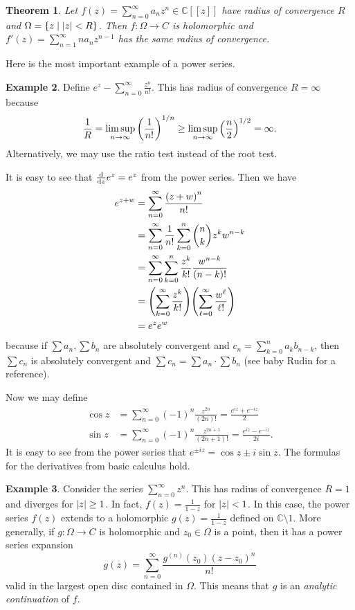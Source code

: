 \documentclass[leqno, openany]{memoir}
\newtheorem{thm}{Theorem}[section]
\theoremstyle{definition}
\newtheorem{exm}[thm]{Example}
\theoremstyle{remark}
\theoremstyle{plain}
\theoremstyle{definition}
\theoremstyle{remark}
\newcommand{\C}{\mathbb{C}}
\begin{document}
\begin{thm} Let $f(z) = \sum_{n=0}^{\infty} a_n z^n \in \C[[z]]$ have radius of
    convergence $R$ and $\Omega = \qty{z \mid \abs{z} < R}$. Then $f \colon
    \Omega \to C$ is holomorphic and $f'(z) = \sum_{n=1}^{\infty} n a_n
    z^{n-1}$ has the same radius of convergence.  \end{thm}

Here is the most important example of a power series.  \begin{exm} Define $e^z
    - \sum_{n = 0}^{\infty} \frac{z^n}{n!}$. This has radius of convergence $R
    = \infty$ because \[ \frac{1}{R} = \limsup_{n \to \infty}
    {\qty(\frac{1}{n!})}^{1/n} \geq \limsup_{n \to \infty}
{\qty(\frac{n}{2})}^{1/2} = \infty. \] Alternatively, we may use the ratio test
instead of the root test.  \end{exm}

It is easy to see that $\dv{z} e^z = e^z$ from the power series. Then we have
\begin{align*} e^{z+w} &= \sum_{n=0}^{\infty} \frac{{(z+w)}^n}{n!} \\ &=
    \sum_{n=0}^{\infty} \frac{1}{n!} \sum_{k=0}^n \binom{n}{k} z^k w^{n-k} \\
    &= \sum_{n=0}^{\infty} \sum_{k=0}^{n} \frac{z^k}{k!} \frac{w^{n-k}}{(n-k)!}
    \\ &= \qty(\sum_{k=0}^{\infty} \frac{z^k}{k!}) \qty(\sum_{\ell =
    0}^{\infty} \frac{w^{\ell}}{\ell!}) \\ &= e^z e^w \end{align*} because if
    $\sum a_n, \sum b_n$ are absolutely convergent and $c_n = \sum_{k=0}^n a_k
    b_{n-k}$, then $\sum c_n$ is absolutely convergent and $\sum c_n = \sum a_n
    \cdot \sum b_n$ (see baby Rudin for a reference).

Now we may define \begin{align*} \cos z &= \sum_{n=0}^{\infty} {(-1)}^n
\frac{z^{2n}}{(2n)!} = \frac{e^{iz} + e^{-iz}}{2} \\ \sin z &=
\sum_{n=0}^{\infty} {(-1)}^n \frac{z^{2n+1}}{(2n+1)!} = \frac{e^{iz} -
e^{-iz}}{2i}.  \end{align*} It is easy to see from the power series that
$e^{\pm iz} = \cos z \pm i \sin z$. The formulas for the derivatives from basic
calculus hold.

\begin{exm} Consider the series $\sum_{n=0}^{\infty} z^n$. This has radius of
    convergence $R = 1$ and diverges for $\abs{z} \geq 1$. In fact, $f(z) =
    \frac{1}{1-z}$ for $\abs{z} < 1$. In this case, the power series $f(z)$
    extends to a holomorphic $g(z) = \frac{1}{1-z}$ defined on $\C \setminus
    \qty{1}$. More generally, if $g \colon \Omega \to C$ is holomorphic and
    $z_0 \in \Omega$ is a point, then it has a power series expansion \[ g(z) =
    \sum_{n=0}^{\infty} \frac{g^{(n)}(z_0) {(z-z_0)}^n}{n!} \] valid in the
    largest open disc contained in $\Omega$. This means that $g$ is an
    \textit{analytic continuation} of $f$.  \end{exm}
\end{document}
